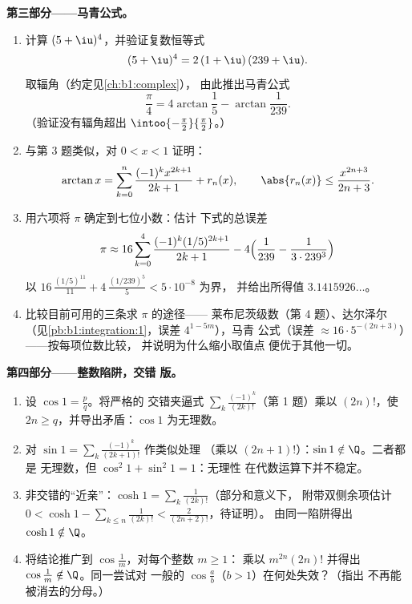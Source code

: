 \begin{problem}
\medskip
\noindent\textbf{第三部分——马青公式。}
\begin{enumerate}[resume]
  \item 计算 $(5 + \iu)^4$，并验证复数恒等式
        \[
        (5 + \iu)^4 = 2\,(1 + \iu)\,(239 + \iu) .
        \]
        取辐角（约定见\cref{ch:b1:complex}），
        由此推出马青公式
        \[
        \frac\pi4 = 4\arctan\frac15 - \arctan\frac{1}{239} .
        \]
        （验证没有辐角超出
        $\intoo{-\frac\pi2}{\frac\pi2}$。）
  \item 与第 3 题类似，对 $0 < x < 1$ 证明：
        \[
        \arctan x = \sum_{k=0}^{n} \frac{(-1)^k
        x^{2k+1}}{2k+1} + r_n(x), \qquad \abs{r_n(x)} \leq
        \frac{x^{2n+3}}{2n+3} .
        \]
  \item 用六项将 $\pi$ 确定到七位小数：估计
        下式的总误差
        \[
        \pi \approx 16\sum_{k=0}^{4}
        \frac{(-1)^k (1/5)^{2k+1}}{2k+1}
        - 4\Bigl(\frac{1}{239} - \frac{1}{3\cdot239^3}\Bigr)
        \]
        以 $16\,\frac{(1/5)^{11}}{11} +
        4\,\frac{(1/239)^5}{5} < 5\cdot10^{-8}$ 为界，
        并给出所得值 $3.1415926\dots$。
  \item 比较目前可用的三条求 $\pi$ 的途径——
        莱布尼茨级数（第 4 题）、达尔泽尔
        （见\cref{pb:b1:integration:1}，误差 $4^{1-5m}$），马青
        公式（误差 $\approx 16\cdot 5^{-(2n+3)}$）——按每项位数比较，
        并说明为什么缩小取值点
        便优于其他一切。
\end{enumerate}

\medskip
\noindent\textbf{第四部分——整数陷阱，交错
版。}
\begin{enumerate}[resume]
  \item 设 $\cos 1 = \frac pq$。将严格的
        交错夹逼式 $\sum_{k}
        \frac{(-1)^k}{(2k)!}$（第 1 题）乘以 $(2n)!$，使 $2n
        \geq q$，并导出矛盾：$\cos 1$
        为无理数。
  \item 对 $\sin 1 = \sum_k \frac{(-1)^k}{(2k+1)!}$ 作类似处理
        （乘以 $(2n+1)!$）：$\sin 1 \notin \Q$。二者都是
        无理数，但 $\cos^2 1 + \sin^2 1 = 1$：无理性
        在代数运算下并不稳定。
  \item 非交错的“近亲”：$\cosh 1 = \sum_k
        \frac{1}{(2k)!}$（部分和意义下，
        附带双侧余项估计 $0 < \cosh 1 - \sum_{k \leq n}
        \frac{1}{(2k)!} < \frac{2}{(2n+2)!}$，待证明）。
        由同一陷阱得出 $\cosh 1 \notin \Q$。
  \item 将结论推广到 $\cos\frac 1m$，对每个整数 $m \geq 1$：
        乘以 $m^{2n}(2n)!$ 并得出 $\cos\frac1m
        \notin \Q$。同一尝试对
        一般的 $\cos\frac ab$（$b > 1$）在何处失效？（指出
        不再能被消去的分母。）
\end{enumerate}


\end{problem}
